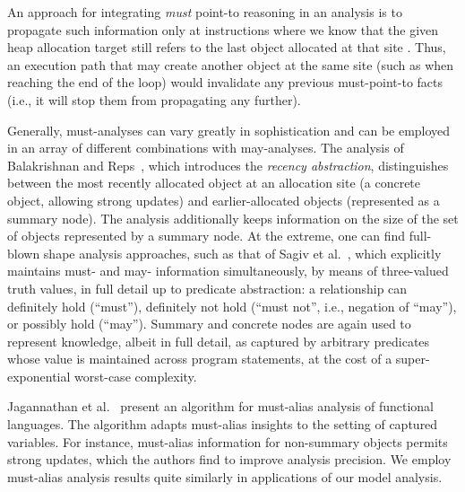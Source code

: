 An approach for integrating \emph{must} point-to reasoning in an
analysis is to propagate such
information only at instructions where we know that the given heap
allocation target still refers to the last object allocated at that
site \cite{Altucher:1995:EFM:199448.199466}. Thus, an execution path
that may create another object at the same site (such as when reaching
the end of the loop) would invalidate any previous must-point-to facts
(i.e., it will stop them from propagating any further).

Generally, must-analyses can vary greatly in sophistication and can be
employed in an array of different combinations with may-analyses.  The
analysis of Balakrishnan and Reps~\cite{sas/BalakrishnanR06}, which
introduces the \emph{recency abstraction}, distinguishes between the
most recently allocated object at an allocation site (a concrete
object, allowing strong updates) and earlier-allocated objects
(represented as a summary node). The analysis additionally keeps
information on the size of the set of objects represented by a summary
node. At the extreme, one can find full-blown shape analysis
approaches, such as that of Sagiv et
al.~\cite{mattmight:Sagiv:2002:TVLA}, which explicitly maintains must-
and may- information simultaneously, by means of three-valued truth
values, in full detail up to predicate abstraction: a
relationship can definitely hold (``must''), definitely not hold
(``must not'', i.e., negation of ``may''), or possibly hold
(``may''). Summary and concrete nodes are again used to represent
knowledge, albeit in full detail, as captured by arbitrary predicates
whose value is maintained across program statements, at the cost of a
super-exponential worst-case complexity.

Jagannathan et al.~\cite{Jagannathan:1998:SLM:268946.268973} present
an algorithm for must-alias analysis of functional languages. The
algorithm adapts must-alias insights to the setting of captured
variables.
For instance, must-alias information for
non-summary objects permits strong updates, which the authors find to
improve analysis precision. We employ must-alias analysis results
quite similarly in applications of our model analysis.




